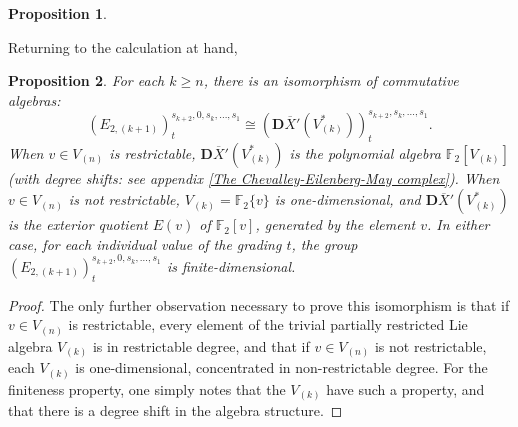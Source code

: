 \documentclass[11pt]{amsart}
\theoremstyle{plain}
\newtheorem{thm}{Theorem}[section]
\newtheorem{prop}[thm]{Proposition}
\theoremstyle{definition}
\renewcommand{\to}{\longrightarrow}
\newcommand{\calW}{\mathcal{W}}
\newcommand{\calL}{\mathcal{L}}
\newcommand{\calMv}{\mathcal{M}_\textup{v}}
\newcommand{\calMh}{\mathcal{M}_\textup{h}}
\theoremstyle{plain}
\newcommand{\UEAX}{\overline{X}'}%
\newcommand{\F}{\mathbb{F}}
\newcommand{\dual}{\mathbf{D}}
\begin{document}
\begin{Calculations of HWn for n nonzero}
\begin{prop}
\end{prop}
Returning to the calculation at hand,
\begin{prop}\label{calculation in internal dimension zero}
For each $k\geq n$, there is an isomorphism of commutative algebras:
\[(E_{2,(k+1)})^{s_{k+2},0,s_k,\ldots,s_1}_{t}\cong(\dual\UEAX(V^*_{(k)}))^{s_{k+2},s_k,\ldots,s_1}_t.\]
When $v\in V_{(n)}$ is restrictable,  $\dual\UEAX(V^*_{(k)})$ is the polynomial algebra $\F_2[V_{(k)}]$ (with degree shifts: see appendix \ref{The Chevalley-Eilenberg-May complex}). When $v\in V_{(n)}$ is not restrictable, $V_{(k)}=\F_{2}\{v\}$ is one-dimensional, and $\dual\UEAX(V^*_{(k)})$ is the exterior quotient $E(v)$ of $\F_2[v]$, generated by the element $v$. In either case, for each individual value of the grading $t$, the group $(E_{2,(k+1)})^{s_{k+2},0,s_k,\ldots,s_1}_{t}$ is finite-dimensional.
\end{prop}
\begin{proof}
The only further observation necessary to prove this isomorphism is that if $v\in V_{(n)}$ is restrictable, every element of the trivial partially restricted Lie algebra $V_{(k)}$ is in restrictable degree, and that if $v\in V_{(n)}$ is not restrictable, each $V_{(k)}$ is one-dimensional, concentrated in non-restrictable degree. For the finiteness property, one simply notes that the $V_{(k)}$ have such a property, and that there is a degree shift in the algebra structure.
\end{proof}


\end{Calculations of HWn for n nonzero}
\end{document}
